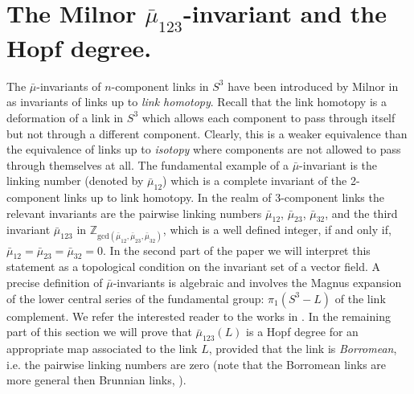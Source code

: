 \documentclass[12pt]{article}
\numberwithin{equation}{section}
\begin{document}

\section{The Milnor \texorpdfstring{$\bar{\mu}_{123}$}{mu-123}-invariant and the Hopf degree.}\label{sec:mu-and-hopf}

The $\bar{\mu}$-invariants of $n$-component links in $S^3$ have been introduced by Milnor in \cite{Milnor54, Milnor57}
as invariants of links up to \emph{link homotopy}. Recall that the link homotopy 
is a deformation of a link in $S^3$ which allows each component to pass through 
itself but not through a different component. Clearly, this is a weaker equivalence than the equivalence of links up to \emph{isotopy} where components are not allowed to pass through themselves at all. The fundamental example of a $\bar{\mu}$-invariant is the linking number (denoted by $\bar{\mu}_{12}$) which is a complete invariant of the 2-component links up to link homotopy. In the realm of 3-component links the relevant invariants are the pairwise linking numbers $\bar{\mu}_{12}$, $\bar{\mu}_{23}$, $\bar{\mu}_{32}$, and the third invariant $\bar{\mu}_{123}$ in $\mathbb{Z}_{\text{gcd}(\bar{\mu}_{12}, \bar{\mu}_{23}, \bar{\mu}_{32})}$, which is 
a well defined integer, if and only if, $\bar{\mu}_{12}=\bar{\mu}_{23}=\bar{\mu}_{32}=0$. In the second part of the paper we will interpret this statement as a topological condition on the invariant set of a vector  field. A precise definition of $\bar{\mu}$-invariants is algebraic and involves the Magnus expansion of the lower central series of the fundamental group: $\pi_1(S^3-L)$ of the link complement. We refer the interested reader to the works in \cite{Milnor54, Milnor57}. In the remaining part of this section we will prove that $\bar{\mu}_{123}(L)$ is a Hopf degree for an appropriate map associated to the link $L$, provided that 
the link is \emph{Borromean}, i.e. the pairwise linking numbers are zero (note that the Borromean links are more general then  Brunnian links, \cite{Milnor54}). 
\end{document}
